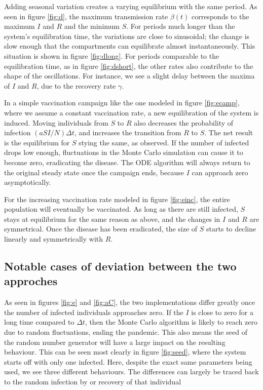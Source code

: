 \documentclass[a4paper,10pt,twocolumn]{article}
\begin{document}
Adding seasonal variation creates a varying equilibrium with the same period. As seen in figure \ref{fig:d}, the maximum transmission rate $\beta(t)$ corresponds to the maximum $I$ and $R$ and the minimum $S$. 
For periods much longer than the system's equilibration time, the variations are close to sinusoidal; the change is slow enough that the compartments can equilibrate almost instantaneously. This situation is shown in figure \ref{fig:dlong}.
For periods comparable to the equilibration time, as in figure \ref{fig:dshort}, the other rates also contribute to the shape of the oscillations. For instance, we see a slight delay between the maxima of $I$ and $R$, due to the recovery rate $\gamma$. 



In a simple vaccination campaign like the one modeled in figure \ref{fig:ecamp}, where we assume a constant vaccination rate, a new equilibration of the system is induced. Moving individuals from $S$ to $R$ also decreases the probability of infection $(aSI/N)\Delta t$, and increases the transition from $R$ to $S$. The net result is the equilibrium for $S$ stying the same, as observed.
If the number of infected drops low enough, fluctuations in the Monte Carlo simulation can cause it to become zero, eradicating the disease. 
The ODE algorithm will always return to the original steady state once the campaign ends, because $I$ can approach zero asymptotically.   

For the increasing vaccination rate modeled in figure \ref{fig:einc}, the entire population will eventually be vaccinated. As long as there are still infected, $S$ stays at equilibrium for the same reason as above, and the changes in $I$ and $R$ are symmetrical. Once the disease has been eradicated, the size of $S$ starts to decline linearly and symmetrically with $R$.
       

\subsection{Notable cases of deviation between the two approches}\label{ssec:dif}

As seen in figures \ref{fig:e} and \ref{fig:aC}, the two implementations differ greatly once the number of infected individuals approaches zero. 
If the $I$ is close to zero for a long  time compared to $\Delta t$, then the Monte Carlo algorithm is likely to reach zero due to random fluctuations, ending the pandemic.
 This also means the seed of the random number generator will have a large impact on the resulting behaviour. 
 This can be seen most clearly in figure \ref{fig:seed}, where the system starts off with only one infected. Here, despite the exact same parameters being used, we see three different behaviours. The differences can largely be traced back to the random infection by or recovery of that individual
\end{document}
